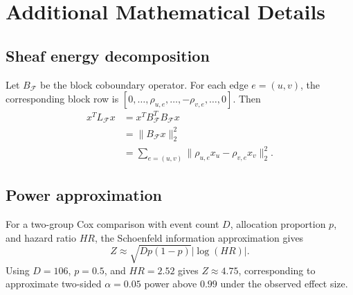\documentclass[conference]{IEEEtran}
\begin{document}
\appendices
\section{Additional Mathematical Details}
\subsection{Sheaf energy decomposition}
Let $B_{\mathcal F}$ be the block coboundary operator. For each edge $e=(u,v)$, the corresponding block row is $[0,\ldots,\rho_{u,e},\ldots,-\rho_{v,e},\ldots,0]$. Then
\begin{align}
x^TL_{\mathcal F}x&=x^TB_{\mathcal F}^TB_{\mathcal F}x\\
&=\|B_{\mathcal F}x\|_2^2\\
&=\sum_{e=(u,v)}\|\rho_{u,e}x_u-\rho_{v,e}x_v\|_2^2.
\end{align}

\subsection{Power approximation}
For a two-group Cox comparison with event count $D$, allocation proportion $p$, and hazard ratio $HR$, the Schoenfeld information approximation gives
\begin{equation}
Z\approx \sqrt{Dp(1-p)}|\log(HR)|.
\end{equation}
Using $D=106$, $p=0.5$, and $HR=2.52$ gives $Z\approx4.75$, corresponding to approximate two-sided $\alpha=0.05$ power above $0.99$ under the observed effect size.
\end{document}
